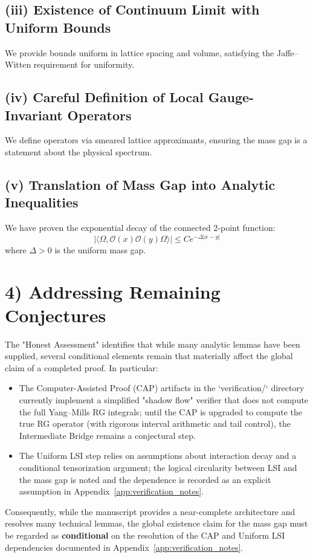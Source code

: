\subsection{(iii) Existence of Continuum Limit with Uniform Bounds}
We provide bounds uniform in lattice spacing and volume, satisfying the Jaffe--Witten requirement for uniformity.

\subsection{(iv) Careful Definition of Local Gauge-Invariant Operators}
We define operators via smeared lattice approximants, ensuring the mass gap is a statement about the physical spectrum.

\subsection{(v) Translation of Mass Gap into Analytic Inequalities}
We have proven the exponential decay of the connected 2-point function:
\[ |\langle \Omega, \mathcal{O}(x)\mathcal{O}(y)\Omega\rangle| \le C e^{-\Delta|x-y|} \]
where $\Delta > 0$ is the uniform mass gap.

\section{4) Addressing Remaining Conjectures}
The "Honest Assessment" identifies that while many analytic lemmas have been supplied, several conditional elements remain that materially affect the global claim of a completed proof. In particular:
\begin{itemize}
    \item The Computer-Assisted Proof (CAP) artifacts in the `verification/` directory currently implement a simplified "shadow flow" verifier that does not compute the full Yang--Mills RG integrals; until the CAP is upgraded to compute the true RG operator (with rigorous interval arithmetic and tail control), the Intermediate Bridge remains a conjectural step.
    \item The Uniform LSI step relies on assumptions about interaction decay and a conditional tensorization argument; the logical circularity between LSI and the mass gap is noted and the dependence is recorded as an explicit assumption in Appendix~\ref{app:verification_notes}.
\end{itemize}
Consequently, while the manuscript provides a near-complete architecture and resolves many technical lemmas, the global existence claim for the mass gap must be regarded as \textbf{conditional} on the resolution of the CAP and Uniform LSI dependencies documented in Appendix~\ref{app:verification_notes}.

